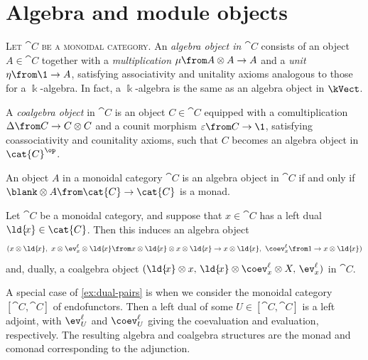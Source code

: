 \section{Algebra and module objects}\label{sec:algebra-and-module-objects}

\textsc{Let \(\cat{C}\) be a monoidal category}.
An \emph{algebra object in \(\cat{C}\)} consists of
an object \(A \in \cat{C}\)
together with a \emph{multiplication} \(\mu\from A \otimes A \to A\)
and a \emph{unit} \(\eta\from \1 \to A\),
satisfying associativity and unitality axioms analogous to those for a \(\Bbbk\)\hyp{}algebra.
In fact, a \(\Bbbk\)\hyp{}algebra is the same as an algebra object in \(\kVect\).

A \emph{coalgebra object} in \(\cat{C}\) is
an object \(C \in \cat{C}\) equipped
with a comultiplication \(\Delta\from C \to C \otimes C\)
and a counit morphism \(\varepsilon\from C \to \1\),
satisfying coassociativity and counitality axioms,
such that \(C\) becomes an algebra object in \(\cat{C}^{\op}\).

\begin{example}\label{ex:monoid-iff-tensoring-is-monad}
  An object \(A\) in a monoidal category \(\cat{C}\) is an algebra object in \(\cat{C}\)
  if and only if \(\blank \otimes A\from \cat{C}\to \cat{C}\) is a monad.
\end{example}

\begin{example}\label{ex:dual-pairs}
  Let \(\cat{C}\) be a monoidal category,
  and suppose that \(x \in \cat{C}\) has a left dual \(\ld{\!{}x} \in \cat{C}\).
  Then this induces an algebra object
  \[
    (x \otimes \ld{\!{}x},
    \ x \otimes \ev_x^{\ell} \otimes \ld{\!{}x}\from x \otimes \ld{\!{}x} \otimes x \otimes \ld{\!{}x} \to x \otimes \ld{\!{}x},
    \ \coev_x^{\ell} \from 1 \to x \otimes \ld{\!{}x})
  \]
  and, dually, a coalgebra object \((\ld{\!{}x} \otimes x,\, \ld{\!{}x} \otimes \coev_x^{\ell} \otimes X,\, \ev_x^{\ell})\) in \(\cat{C}\).
\end{example}

A special case of \cref{ex:dual-pairs} is when we consider the monoidal category \([\cat{C},\cat{C}]\) of endofunctors.
Then a left dual of some \(U \in [\cat{C},\cat{C}]\) is a left adjoint,
with \(\ev_U^{\ell}\) and \(\coev_U^{\ell}\) giving the coevaluation and evaluation, respectively.
The resulting algebra and coalgebra structures are the monad and comonad corresponding to the adjunction.

